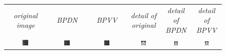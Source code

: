 \documentclass[twocolumn,twoside]{IEEEtran/IEEEtran}
\begin{document}
\noindent 
\begingroup \setlength{\tabcolsep}{1pt}
\begin{figure}[htbp]
  \centering
  \begin{tabular}{cccccc}
    \textit{\small original image} & \textit{\small BPDN} & \textit{\small BPVV} & \textit{\small detail of original} & \textit{\small detail of BPDN} & \textit{\small detail of BPVV} \\
    \includegraphics[width=0.16\textwidth]{figures-SBA/circulargrating_gt_framed}
                                   & \includegraphics[width=0.16\textwidth]{figures-SBA/circulargrating_40mu}		
                                                          & \includegraphics[width=0.16\textwidth]{figures-SBA/circulargrating_bptv_40mu}
                                                                                 & \includegraphics[width=0.16\textwidth]{figures-SBA/circulargrating_gt_zoomin}
                                                                                                                      & \includegraphics[width=0.16\textwidth]{figures-SBA/circulargrating_mu40_zoomin}
                                                                                                                                                       & \includegraphics[width=0.16\textwidth]{figures-SBA/circulargrating_bptv_40mu_zoomin}\\	

\end{tabular}
\end{figure}
\end{document}
